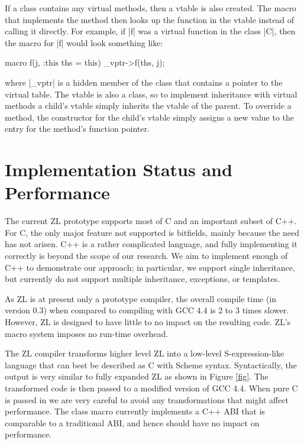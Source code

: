 If a class contains any virtual methods, then a vtable is also created.
The macro that implements the method then looks up the function in the
vtable instead of calling it directly.  For example, if |f| was a
virtual function in the class |C|, then the macro for |f| would look
something like:
\begin{code}
macro f(j, :this ths = this) {_vptr->f(ths, j);}
\end{code}
where |_vptr| is a hidden member of the class that contains a pointer
to the virtual table.  The vtable is also a class, so to implement
inheritance with virtual methods a child's vtable simply inherits the
vtable of the parent.  To override a method, the constructor for the
child's vtable simply assigns a new value to the entry for the method's
function pointer.


\appendix


\chapter{Implementation Status and Performance}
\label{status}

The current ZL prototype supports most of C and an
important subset of C++.  For C, the only major feature not supported
is bitfields, mainly because the need has not arisen.  C++ is a rather
complicated language, and fully implementing it correctly is beyond
the scope of our research.  We aim to implement enough of C++ to
demonstrate our approach; in particular, we support single
inheritance, but currently do not support multiple inheritance,
exceptions, or templates.

As ZL is at present only a prototype compiler, the overall compile
time (in version 0.3) when compared to compiling with GCC 4.4
is 2 to 3 times slower.  However, ZL is designed to have little to no
impact on the resulting code.  ZL's macro system imposes no run-time
overhead.

The ZL compiler transforms higher level ZL into a low-level
S-expression-like language that can best be described as C with
Scheme syntax.  Syntactically, the output is very similar to fully
expanded ZL as shown in Figure \ref{fig}.
The transformed code is then passed to a modified version
of GCC 4.4. When pure C is passed in we are very careful to avoid any
transformations that might affect performance.  The class macro
currently implements a C++ ABI that is comparable to a traditional
ABI, and hence should have no impact on performance.

